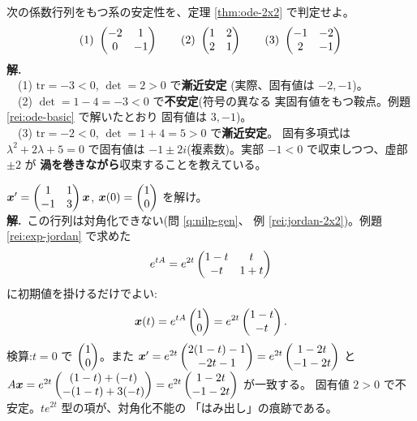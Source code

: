 \begin{rei}[例題・基本(安定性の判定)]\label{rei:ode-stability}
次の係数行列をもつ系の安定性を、定理 \ref{thm:ode-2x2} で判定せよ。
\[
(1)\ \begin{pmatrix}-2 & 1 \\ 0 & -1\end{pmatrix} \qquad
(2)\ \begin{pmatrix}1 & 2 \\ 2 & 1\end{pmatrix} \qquad
(3)\ \begin{pmatrix}-1 & -2 \\ 2 & -1\end{pmatrix}
\]
\textbf{解.}\\
　(1) $\mathrm{tr} = -3 < 0$, $\det = 2 > 0$ で\textbf{漸近安定}
(実際、固有値は $-2, -1$)。\\
　(2) $\det = 1 - 4 = -3 < 0$ で\textbf{不安定}(符号の異なる
実固有値をもつ鞍点。例題 \ref{rei:ode-basic} で解いたとおり
固有値は $3, -1$)。\\
　(3) $\mathrm{tr} = -2 < 0$, $\det = 1 + 4 = 5 > 0$ で\textbf{漸近安定}。
固有多項式は $\lambda^2 + 2\lambda + 5 = 0$ で固有値は
$-1 \pm 2i$(複素数)。実部 $-1 < 0$ で収束しつつ、虚部 $\pm 2$ が
\textbf{渦を巻きながら}収束することを教えている。
\end{rei}

\begin{rei}\label{rei:ode-jordan}
$\bm{x}' = \begin{pmatrix}1 & 1 \\ -1 & 3\end{pmatrix}\bm{x}$,
$\bm{x}(0) = \begin{pmatrix}1 \\ 0\end{pmatrix}$ を解け。\\
\textbf{解.}\ この行列は対角化できない(問 \ref{q:nilp-gen}、
例 \ref{rei:jordan-2x2})。例題 \ref{rei:exp-jordan} で求めた
\[
e^{tA} = e^{2t}\begin{pmatrix}1 - t & t \\ -t & 1 + t\end{pmatrix}
\]
に初期値を掛けるだけでよい:
\[
\bm{x}(t) = e^{tA}\begin{pmatrix}1 \\ 0\end{pmatrix} = e^{2t}\begin{pmatrix}1 - t \\ -t\end{pmatrix}.
\]
検算:$t = 0$ で $\begin{pmatrix}1 \\ 0\end{pmatrix}$。また
$\bm{x}' = e^{2t}\begin{pmatrix}2(1-t) - 1 \\ -2t - 1\end{pmatrix} = e^{2t}\begin{pmatrix}1 - 2t \\ -1 - 2t\end{pmatrix}$
と
$A\bm{x} = e^{2t}\begin{pmatrix}(1-t) + (-t) \\ -(1-t) + 3(-t)\end{pmatrix}
= e^{2t}\begin{pmatrix}1 - 2t \\ -1 - 2t\end{pmatrix}$ が一致する。
固有値 $2 > 0$ で不安定。$te^{2t}$ 型の項が、対角化不能の
「はみ出し」の痕跡である。
\end{rei}

